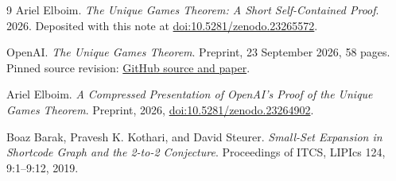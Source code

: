 \documentclass[11pt]{article}
\newcommand{\depositdoi}{10.5281/zenodo.23265572}
\begin{document}
{\small
\begin{thebibliography}{9}
Ariel Elboim. \emph{The Unique Games Theorem: A Short Self-Contained
Proof}. 2026. Deposited with this note at
\href{https://doi.org/\depositdoi}{doi:\depositdoi}.

OpenAI. \emph{The Unique Games Theorem}. Preprint, 23 September 2026,
58 pages. Pinned source revision:
\href{https://github.com/openai/math/tree/fd4aeeb2ee4fc729c18d98444fed42fd0529eeeb/preprints/The-Unique-Games-Theorem-September-23-2026}{GitHub source and paper}.

Ariel Elboim. \emph{A Compressed Presentation of OpenAI's Proof of the
Unique Games Theorem}. Preprint, 2026,
\href{https://doi.org/10.5281/zenodo.23264902}{doi:10.5281/zenodo.23264902}.

Boaz Barak, Pravesh K. Kothari, and David Steurer.
\emph{Small-Set Expansion in Shortcode Graph and the 2-to-2 Conjecture}.
Proceedings of ITCS, LIPIcs 124, 9:1--9:12, 2019.
\end{thebibliography}
}
\end{document}
